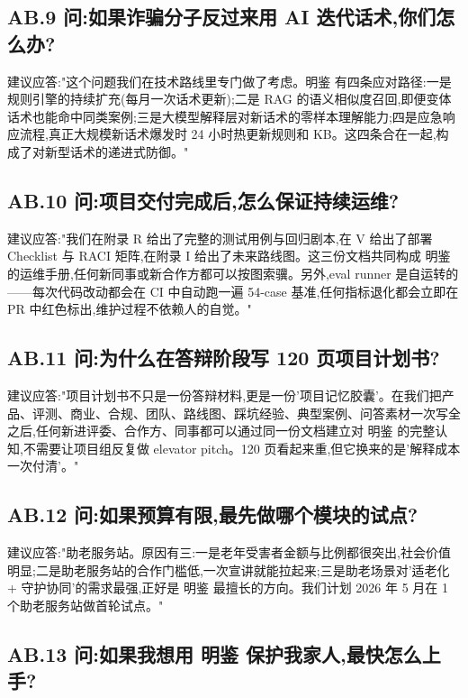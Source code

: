\documentclass[UTF8,a4paper,12pt]{ctexart}
\begin{document}
\subsection*{AB.9 问:如果诈骗分子反过来用 AI 迭代话术,你们怎么办?}

建议应答:"这个问题我们在技术路线里专门做了考虑。明鉴 有四条应对路径:一是规则引擎的持续扩充(每月一次话术更新);二是 RAG 的语义相似度召回,即便变体话术也能命中同类案例;三是大模型解释层对新话术的零样本理解能力;四是应急响应流程,真正大规模新话术爆发时 24 小时热更新规则和 KB。这四条合在一起,构成了对新型话术的递进式防御。"

\subsection*{AB.10 问:项目交付完成后,怎么保证持续运维?}

建议应答:"我们在附录 R 给出了完整的测试用例与回归剧本,在 V 给出了部署 Checklist 与 RACI 矩阵,在附录 I 给出了未来路线图。这三份文档共同构成 明鉴 的运维手册,任何新同事或新合作方都可以按图索骥。另外,eval runner 是自运转的——每次代码改动都会在 CI 中自动跑一遍 54-case 基准,任何指标退化都会立即在 PR 中红色标出,维护过程不依赖人的自觉。"

\subsection*{AB.11 问:为什么在答辩阶段写 120 页项目计划书?}

建议应答:"项目计划书不只是一份答辩材料,更是一份'项目记忆胶囊'。在我们把产品、评测、商业、合规、团队、路线图、踩坑经验、典型案例、问答素材一次写全之后,任何新进评委、合作方、同事都可以通过同一份文档建立对 明鉴 的完整认知,不需要让项目组反复做 elevator pitch。120 页看起来重,但它换来的是'解释成本一次付清'。"

\subsection*{AB.12 问:如果预算有限,最先做哪个模块的试点?}

建议应答:"助老服务站。原因有三:一是老年受害者金额与比例都很突出,社会价值明显;二是助老服务站的合作门槛低,一次宣讲就能拉起来;三是助老场景对'适老化 + 守护协同'的需求最强,正好是 明鉴 最擅长的方向。我们计划 2026 年 5 月在 1 个助老服务站做首轮试点。"

\subsection*{AB.13 问:如果我想用 明鉴 保护我家人,最快怎么上手?}
\end{document}
